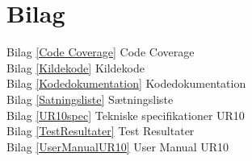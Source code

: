 \chapter{Bilag}\label{Bilag}
Bilag \ref{Code Coverage} Code Coverage			\\
Bilag \ref{Kildekode} Kildekode					\\
Bilag \ref{Kodedokumentation} Kodedokumentation					\\					
Bilag \ref{Satningsliste} Sætningsliste 				\\
Bilag \ref{UR10spec} Tekniske specifikationer UR10		\\
Bilag \ref{TestResultater}  Test Resultater			\\
Bilag \ref{UserManualUR10}  User Manual UR10 		\\				
